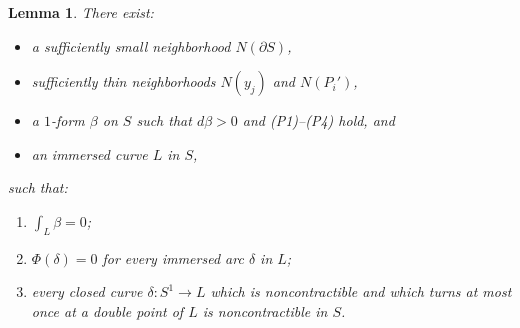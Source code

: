 \documentclass[JEP,XML,SOM,Unicode,NoFloatCountersInSection]{cedram}
\theoremstyle{plain}
\newtheorem{lemma}[thm]{Lemma}
\theoremstyle{definition}
\numberwithin{equation}{subsection}
\newcommand{\bdry}{\partial}
\begin{document}
\begin{lemma}\label{lemma: technical}
There exist:
\begin{itemize}
\item a sufficiently small neighborhood $N(\bdry S)$,
\item sufficiently thin neighborhoods $N(y_j)$ and $N(P_i')$,
\item a $1$-form $\beta$ on $S$ such that $d\beta>0$ and {\em (P1)--(P4)} hold, and
\item an immersed curve $L$ in $S$,
\end{itemize}
such that:
\begin{enumerate}\renewcommand{\theenumi}{\Alph{enumi}}
\item\label{enum:A}
$\int_{L} \beta =0$;
\item\label{enum:B}
$\Phi (\delta) =0$ for every immersed arc $\delta$ in $L$;
\item\label{enum:C}
every closed curve $\delta:S^1\to L$ which is noncontractible and which turns at most once at a double point of $L$ is noncontractible in $S$.
\end{enumerate}
\end{lemma}
\end{document}
